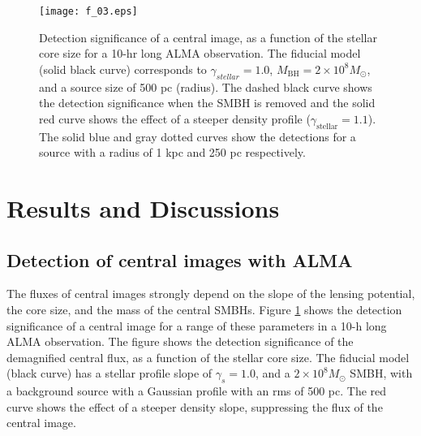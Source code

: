 \documentclass[chicago]{emulateapj}
\begin{document}
\begin{figure}
\begin{center}
\centering
\texttt{[image: f\_03.eps]}
\centering
\end{center}
\caption{ Detection significance of a central image, as a function of the stellar core size for a 10-hr long ALMA observation. 
The fiducial model (solid black curve) corresponds to $\gamma_{stellar}=1.0$, $M_{\mathrm{BH}}=2\times10^8 M_{\odot}$, and a source size of 500 pc (radius). The dashed black curve shows the detection significance when the SMBH is removed and the solid red curve shows the effect of a steeper density profile ($\gamma_{\mathrm{stellar}}=1.1$). The solid blue and gray dotted curves show the detections for a source with a radius of 1 kpc and 250 pc respectively. 
\label{fig:3}}
\end{figure}

\section{Results and Discussions}
\subsection{Detection of central images with ALMA}
The fluxes of central images strongly depend on the slope of the lensing potential, the core size, and the mass of the central SMBHs.  Figure \ref{fig:3} shows the detection significance of a central image for a range of these parameters in a 10-h long ALMA observation. 
The figure shows the detection significance of the demagnified central flux, as a function of the stellar core size.
The fiducial model (black curve) has a stellar profile slope of $\gamma_s=1.0$, and a $2\times10^8M_{\odot}$ SMBH, with a background source 
with a Gaussian profile with an rms of 500 pc.  The red curve shows the effect of a steeper density slope, suppressing the flux of the central image. 
\end{document}
